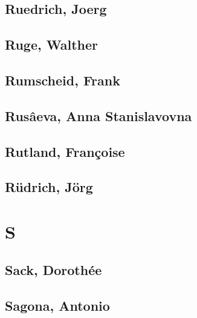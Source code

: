 \subsection[Ruedrich, Joerg (1)]{Ruedrich, Joerg}

\subsection[Ruge, Walther (2)]{Ruge, Walther}


\subsection[Rumscheid, Frank (1)]{Rumscheid, Frank}

\subsection[Rusâeva, Anna Stanislavovna (2)]{Rusâeva, Anna Stanislavovna}


\subsection[Rutland, Françoise (1)]{Rutland, Françoise}

\subsection[Rüdrich, Jörg (1)]{Rüdrich, Jörg}

\section{S}

\subsection[Sack, Dorothée (1)]{Sack, Dorothée}

\subsection[Sagona, Antonio (1)]{Sagona, Antonio}

